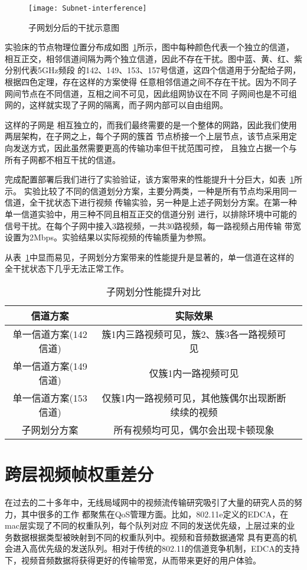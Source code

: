 \begin{figure}[H] %
  \centering
  \texttt{[image: Subnet-interference]}
  \caption{子网划分后的干扰示意图}
  \label{fig:subnet_interference}
\end{figure}
实验床的节点物理位置分布成如图~\ref{fig:subnet_interference}所示，图中每种颜色代表一个独立的信道，
相互正交，相邻信道间隔为两个独立信道，因此不存在干扰。图中蓝、黄、红、紫分别代表5GHz频段
的142、149、153、157号信道，这四个信道用于分配给子网，根据四色定理，存在这样的方案使得
任意相邻信道之间不存在干扰。因为不同子网间节点在不同信道，互相之间不可见，因此组网协议在不同
子网间也是不可组网的，这样就实现了子网的隔离，而子网内部可以自由组网。

这样的子网是
相互独立的，而我们最终需要的是一个整体的网路，因此我们使用两层架构，在子网之上，每个子网的簇首
节点桥接一个上层节点，该节点采用定向发送方式，因此虽然需要更高的传输功率但干扰范围可控，
且独立占据一个与所有子网都不相互干扰的信道。

完成配置部署后我们进行了实验验证，该方案带来的性能提升十分巨大，如表~\ref{tab:subnet_comp}所示。
实验比较了不同的信道划分方案，主要分两类，一种是所有节点均采用同一信道，全干扰状态下进行视频
传输实验，另一种是上述子网划分方案。在第一种单一信道实验中，用三种不同且相互正交的信道分别
进行，以排除环境中可能的信号干扰。在每个子网中接入3路视频，一共30路视频，每一路视频占用传输
带宽设置为2Mbps。实验结果以实际视频的传输质量为参照。

从表~\ref{tab:subnet_comp}中显而易见，子网划分方案带来的性能提升是显著的，单一信道在这样的
全干扰状态下几乎无法正常工作。
\begin{table}[htbp]
  \centering
  \caption{子网划分性能提升对比}
  \label{tab:subnet_comp}
  \begin{tabular}{|c|c|c|}
  \hline
  信道方案 & 实际效果 \\
  \hline
  单一信道方案(142信道) & 簇1内三路视频可见，簇2、簇3各一路视频可见 \\
  \hline
  单一信道方案(149信道) & 仅簇1内一路视频可见 \\
  \hline
  单一信道方案(153信道) & 仅簇1内一路视频可见，其他簇偶尔出现断断续续的视频 \\
  \hline
  子网划分方案 & 所有视频均可见，偶尔会出现卡顿现象 \\
  \hline
  \end{tabular}
\end{table}

\section{跨层视频帧权重差分}
\label{sec:2}
在过去的二十多年中，无线局域网中的视频流传输研究吸引了大量的研究人员的努力，其中很多的工作
都聚焦在QoS管理方面。比如，802.11e定义的EDCA，在mac层实现了不同的权重队列，每个队列对应
不同的发送优先级，上层过来的业务数据根据类型被映射到不同的权重队列中。视频和音频数据通常
具有更高的机会进入高优先级的发送队列。相对于传统的802.11的信道竞争机制，EDCA的支持
下，视频音频数据将获得更好的传输带宽，从而带来更好的用户体验。

